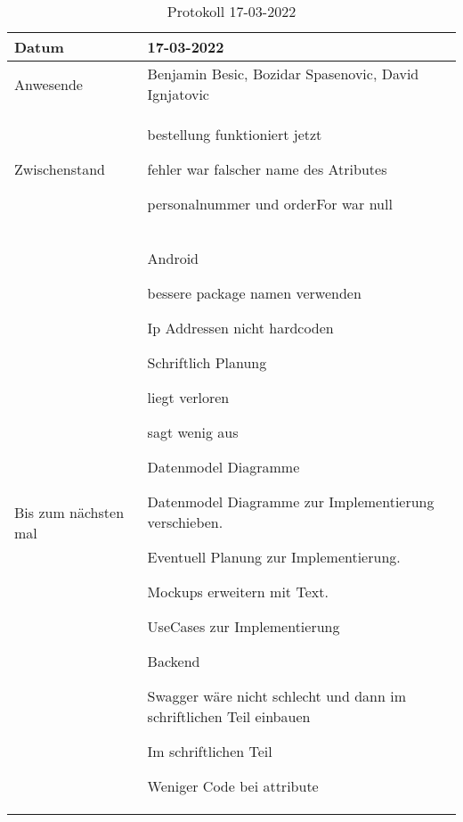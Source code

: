 \begin{table}
    \begin{tabular}{ |p{3cm}|p{10cm}|   }
        \hline
        Datum & 17-03-2022\\
        \hline
        Anwesende & Benjamin Besic, Bozidar Spasenovic, David Ignjatovic\\

        \hline
        Zwischenstand& 



        bestellung funktioniert jetzt

        fehler war falscher name des Atributes

        personalnummer und orderFor war null



    \\
        \hline
        Bis zum nächsten mal &  Android

        bessere package namen verwenden
    
        Ip Addressen nicht hardcoden
    
     Schriftlich
     Planung
    
        liegt verloren
    
        sagt wenig aus
    
        Datenmodel Diagramme
    
        Datenmodel Diagramme zur Implementierung verschieben.
    
        Eventuell Planung zur Implementierung.
    
        Mockups erweitern mit Text.
    
        UseCases zur Implementierung
    
     Backend
    
        Swagger wäre nicht schlecht und dann im schriftlichen Teil einbauen
    
        Im schriftlichen Teil
    
            Weniger Code bei attribute
    
    \\
        \hline
    \end{tabular}
    \caption{Protokoll 17-03-2022}
    \label{tab:my_label}
\end{table}
